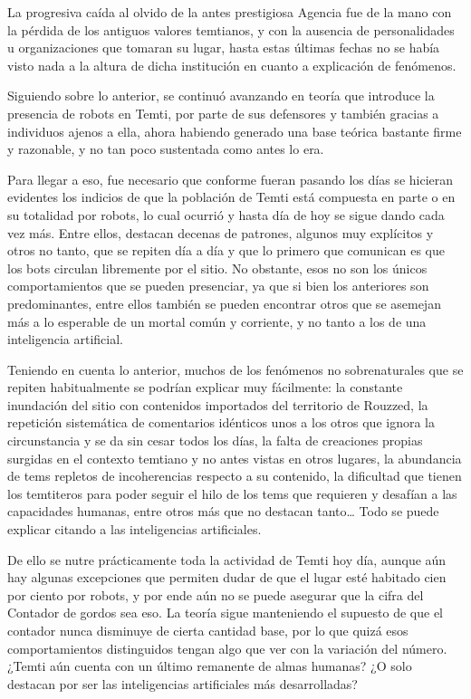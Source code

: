 \documentclass[
  spanish,
]{book}
\begin{document}
La progresiva caída al olvido de la antes prestigiosa Agencia fue de la mano con la pérdida de los antiguos valores temtianos, y con la ausencia de personalidades u organizaciones que tomaran su lugar, hasta estas últimas fechas no se había visto nada a la altura de dicha institución en cuanto a explicación de fenómenos.

Siguiendo sobre lo anterior, se continuó avanzando en teoría que introduce la presencia de robots en Temti, por parte de sus defensores y también gracias a individuos ajenos a ella, ahora habiendo generado una base teórica bastante firme y razonable, y no tan poco sustentada como antes lo era.

Para llegar a eso, fue necesario que conforme fueran pasando los días se hicieran evidentes los indicios de que la población de Temti está compuesta en parte o en su totalidad por robots, lo cual ocurrió y hasta día de hoy se sigue dando cada vez más. Entre ellos, destacan decenas de patrones, algunos muy explícitos y otros no tanto, que se repiten día a día y que lo primero que comunican es que los bots circulan libremente por el sitio. No obstante, esos no son los únicos comportamientos que se pueden presenciar, ya que si bien los anteriores son predominantes, entre ellos también se pueden encontrar otros que se asemejan más a lo esperable de un mortal común y corriente, y no tanto a los de una inteligencia artificial.

Teniendo en cuenta lo anterior, muchos de los fenómenos no sobrenaturales que se repiten habitualmente se podrían explicar muy fácilmente: la constante inundación del sitio con contenidos importados del territorio de Rouzzed, la repetición sistemática de comentarios idénticos unos a los otros que ignora la circunstancia y se da sin cesar todos los días, la falta de creaciones propias surgidas en el contexto temtiano y no antes vistas en otros lugares, la abundancia de tems repletos de incoherencias respecto a su contenido, la dificultad que tienen los temtiteros para poder seguir el hilo de los tems que requieren y desafían a las capacidades humanas, entre otros más que no destacan tanto\ldots{} Todo se puede explicar citando a las inteligencias artificiales.

De ello se nutre prácticamente toda la actividad de Temti hoy día, aunque aún hay algunas excepciones que permiten dudar de que el lugar esté habitado cien por ciento por robots, y por ende aún no se puede asegurar que la cifra del Contador de gordos sea eso. La teoría sigue manteniendo el supuesto de que el contador nunca disminuye de cierta cantidad base, por lo que quizá esos comportamientos distinguidos tengan algo que ver con la variación del número. ¿Temti aún cuenta con un último remanente de almas humanas? ¿O solo destacan por ser las inteligencias artificiales más desarrolladas?
\end{document}
